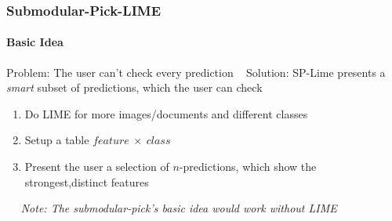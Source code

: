 \begin{frame}
	\frametitle{Submodular-Pick-LIME}
	\framesubtitle{Basic Idea}
	Problem: The user can't check every prediction ~\newline
	Solution: SP-Lime presents a \textit{smart} subset of predictions, which the user can check
	\begin{LARGE}
		\begin{enumerate}
			\item Do LIME for more images/documents and different classes
			\item Setup a table $feature~\times~class$
			\item Present the user a selection of $n$-predictions, which show the strongest,distinct features 
		\end{enumerate}
	\end{LARGE}
~\newline ~\newline 
\textit{Note: The submodular-pick's basic idea would work without LIME}
\end{frame}